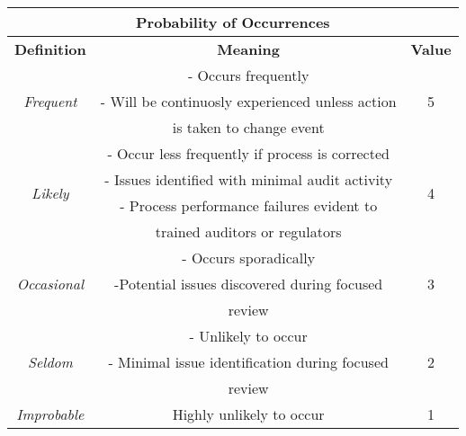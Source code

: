 \documentclass[12pt, oneside]{book}   	%
\begin{document}
\begin{table}[h]
\centering
\begin{tabular}{|c|c|c|}
\hline
\multicolumn{3}{|c|}{\textbf{Probability of Occurrences}}\\
\hline
\textbf{Definition} & \textbf{Meaning} & \textbf{Value} \\
\hline
& - Occurs frequently & \\
\textit{Frequent}  &- Will be continuosly experienced unless action & 5 \\
& is taken to change event & \\
\hline
& - Occur less frequently if process is corrected & \\
\multirow{2}{*}{\textit{Likely}} & - Issues identified with minimal audit activity & \multirow{2}{*}{4} \\
& - Process performance failures evident to & \\ 
& trained auditors or regulators & \\
\hline
\multirow{3}{*}{\textit{Occasional}} & - Occurs sporadically & \multirow{3}{*}{3}\\
&-Potential issues discovered during focused & \\
&review&\\
\hline 
\multirow{3}{*}{\textit{Seldom}} & - Unlikely to occur & \multirow{3}{*}{2}\\
& - Minimal issue identification during focused & \\
& review & \\
\hline
\textit{Improbable} & Highly unlikely to occur & 1 \\
\hline
\end{tabular}
\end{table}
\clearpage
\end{document}
